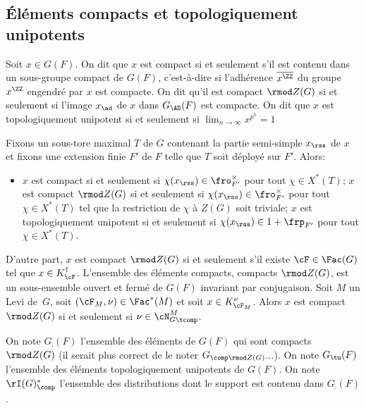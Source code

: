 \subsection{Éléments compacts et topologiquement unipotents}\label{elementscompacts}
Soit $x\in G(F)$. On dit que $x$ est compact si et seulement s'il est contenu dans un sous-groupe compact de $G(F)$, c'est-à-dire si l'adhérence $\overline{x^{\ZZ}}$ du groupe $x^{\ZZ}$ engendré par $x$ est compacte. On dit qu'il est compact $\rmod Z(G)$ si et seulement si l'image $x_{\ad}$ de $x$ dans $G_{\AD}(F)$ est compacte. On dit que $x$ est topologiquement unipotent si et seulement si $\lim_{n\to \infty}x^{p^n}=1$

Fixons un sous-tore maximal $T$ de $G$ contenant la partie semi-simple $x_{\rss}$ de $x$ et fixons une extension finie $F'$ de $F$ telle que $T$ soit déployé sur $F'$. Alors:
\begin{itemize}
\item
$x$ est compact si et seulement si $ \chi(x_{\rss})\in \fro^{\times}_{F'}$ pour tout $\chi\in X^*(T)$; $x$ est compact $\rmod Z(G)$ si et seulement si $ \chi(x_{\rss})\in \fro^{\times}_{F'}$ pour tout $\chi\in X^*(T)$ tel que la restriction de $\chi$ à $Z(G)$ soit triviale; $x$ est topologiquement unipotent si et seulement si $\chi(x_{\rss})\in 1+\frp_{F'}$ pour tout $\chi\in X^*(T)$.
\end{itemize}

D'autre part, $x$ est compact $\rmod Z(G)$ si et seulement s'il existe $\cF\in \Fac(G)$ tel que $x\in K_{\cF}^{\dag}$. L'ensemble des éléments compacts, \resp compacts $\rmod Z(G)$, est un sous-ensemble ouvert et fermé de $G(F)$ invariant par conjugaison. Soit $M$ un Levi de~$G$, soit $(\cF_{M},\nu)\in \Fac^*(M)$ et soit $x\in K_{\cF_{M}}^{\nu}$. Alors $x$ est compact $\rmod Z(G)$ si et seulement si $\nu\in \cN^M_{G\tcomp}$.

On note $G_{\comp}(F)$ l'ensemble des éléments de $G(F)$ qui sont compacts $\rmod Z(G)$ (il serait plus correct de le noter $G_{\comp\rmod Z(G)}$...). On note $G_{\tu}(F)$ l'ensemble des éléments topologiquement unipotents de $G(F)$. On note $\rI(G)^*_{\comp}$ l'ensemble des distributions dont le support est contenu dans $G_{\comp}(F)$.

